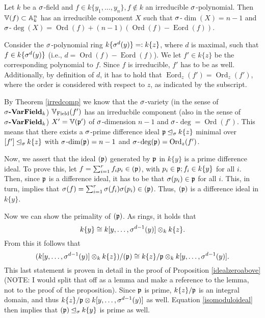 \begin{cor}\label{corfinal}
Let $k$ be a $\sigma$-field and $f \in k\{y_1,\ldots,y_n\}, f \notin k$ an irreducible $\sigma$-polynomial. 
Then $\mathbb{V}(f) \subset \mathbb{A}_k^n$ has an irreducible component $X$ such that $\sigma$-$\dim(X) = n-1$ and $\sigma$-$\operatorname{deg}(X) = \operatorname{Ord}(f) + (n-1)(\operatorname{Ord}(f) - \operatorname{Eord}(f))$.
\begin{bew}
Consider the $\sigma$-polynomial ring $k\{\sigma^d(y)\} =: k\{z\}$, where $d$ is maximal, such that $f \in k\{\sigma^d(y)\}$ (i.e., $d = \operatorname{Ord}(f) - \operatorname{Eord}(f)$). We let $f'\in k\{z\}$ be the corresponding polynomial to $f$. 
Since $f$ is irreducible, $f'$ has to be as well. Additionally, by definition of $d$, it has to hold that $\operatorname{Eord}_z(f') = \operatorname{Ord}_z(f')$, where the order is considered with respect to $z$,
as indicated by the subscript. 

By Theorem \ref{irredcomp} we know that the $\sigma$-variety (in the sense of $\sigma\text{{\normalfont\textbf{-VarField}}}_k$) $ \mathbb{V}_{\operatorname{Field}}(f')$ has an irreducbile component (also in the sense of $\sigma\text{{\normalfont\textbf{-VarField}}}_k$) $X' = \mathbb{V}(\mathfrak{p}')$ of $\sigma$-dimension $n-1$ and $\sigma$-$\operatorname{deg} = \operatorname{Ord}(f')$. This means that there exists a $\sigma$-prime difference ideal $\mathfrak{p} \unlhd_{\sigma} k\{z\}$ minimal over $[f'] \unlhd_{\sigma} k\{z\}$ with
$\sigma$-$\dim(\mathfrak{p}) = n-1$ and $\sigma$-$\operatorname{deg}(\mathfrak{p}) = \operatorname{Ord}_z(f')$. 

Now, we assert that the ideal $(\mathfrak{p})$ generated by $\mathfrak{p}$ in $k\{y\}$ is a prime difference ideal. 
To prove this, let $f = \sum_{i=1}^r f_i p_i \in (\mathfrak{p})$, with $p_i \in \mathfrak{p}; f_i \in k\{y\}$ for all $i$. Then, since $\mathfrak{p}$ is a difference ideal, it has to be that $\sigma(p_i) \in \mathfrak{p}$ for all $i$.
This, in turn, implies that $\sigma(f) =  \sum_{i=1}^r \sigma(f_i) \sigma(p_i) \in (\mathfrak{p})$. Thus, $(\mathfrak{p})$ is a difference ideal in $k\{y\}$. 

Now we can show the primality of $(\mathfrak{p})$. As rings, it holds that $$k\{y\} \cong k[y,\ldots,\sigma^{d-1}(y)] \otimes_k k\{z\}.$$
From this it follows that 
\begin{equation}\label{isomoduloideal} (k[y,\ldots,\sigma^{d-1}(y)] \otimes_k k\{z\}) / (\mathfrak{p}) \cong k\{z\} / \mathfrak{p} \otimes_k k[y,\ldots,\sigma^{d-1}(y)]. \end{equation}
This last statement is proven in detail in the proof of Proposition \ref{idealzeroabove} (NOTE: I would split that off as a lemma and make a reference to the lemma, not to the proof of the proposition).
Since $\mathfrak{p}$ is prime, $k\{z\}/\mathfrak{p}$ is an integral domain, and thus $k\{z\}/\mathfrak{p} \otimes k[y,\ldots,\sigma^{d-1}(y)]$ as well.
Equation \ref{isomoduloideal} then implies that $(\mathfrak{p}) \unlhd_{\sigma} k\{y\}$ is prime as well. 


\end{bew}
\end{cor}
